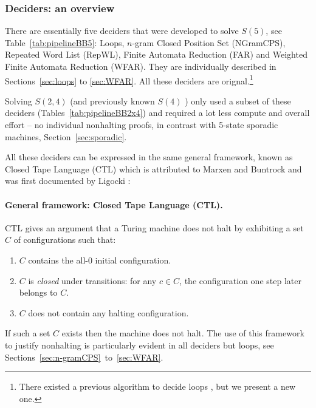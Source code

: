 \newpage

\subsubsection{Deciders: an overview}\label{sec:deciders-overview}

There are essentially five deciders that were developed to solve $S(5)$, see Table~\ref{tab:pipelineBB5}: Loops, $n$-gram Closed Position Set (NGramCPS), Repeated Word List (RepWL), Finite Automata Reduction (FAR) and Weighted Finite Automata Reduction (WFAR). They are individually described in Sections~\ref{sec:loops} to \ref{sec:WFAR}. All these deciders are orignal.\footnote{There existed a previous algorithm to decide loops \cite{Lin1963}, but we present a new one.}



Solving $S(2,4)$ (and previously known $S(4)$ \cite{Brady83}) only used  a subset of these deciders (Tables~\ref{tab:pipelineBB2x4}) and required a lot less compute and overall effort -- \eg no individual nonhalting proofs, in contrast with 5-state sporadic machines, Section~\ref{sec:sporadic}.

All these deciders can be expressed in the same general framework, known as Closed Tape Language (CTL) which is attributed to Marxen and Buntrock and was first documented by Ligocki \cite{ShawnCTL}:

\paragraph{General framework: Closed Tape Language (CTL).} CTL gives an argument that a Turing machine does not halt by exhibiting a set $C$ of configurations such that:
\begin{enumerate}
    \item $C$ contains the all-0 initial configuration.
    \item $C$ is \textit{closed} under transitions: for any $c \in C$, the configuration one step later belongs to $C$.
    \item $C$ does not contain any halting configuration.
\end{enumerate}


If such a set $C$ exists then the machine does not halt. The use of this framework to justify nonhalting is particularly evident in all deciders but loops, see Sections~\ref{sec:n-gramCPS}~to~\ref{sec:WFAR}.

